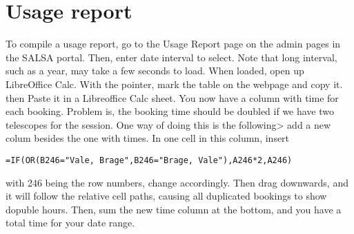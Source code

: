 \section{Usage report}
To compile a usage report, go to the Usage Report page on the admin pages in the
SALSA portal. Then, enter date interval to select. Note that long interval, such as a year,
may take a few seconds to load. When loaded, open up LibreOffice Calc. 
With the pointer, mark the table on the webpage and copy it. then
Paste it in a Libreoffice Calc sheet. 
You now have a column with time for each booking. Problem is, the booking
time should be doubled if we have two telescopes for the session. One 
way of doing this is the following> add a new colum besides the one with times.
In one cell in this column, insert
\begin{verbatim}
=IF(OR(B246="Vale, Brage",B246="Brage, Vale"),A246*2,A246)
\end{verbatim}
with 246 being the row numbers, change accordingly.
Then drag downwards, and it will follow the relative cell paths,
causing all duplicated bookings to show dopuble hours. Then, sum
the new time column at the bottom, and you have a total time
for your date range.
